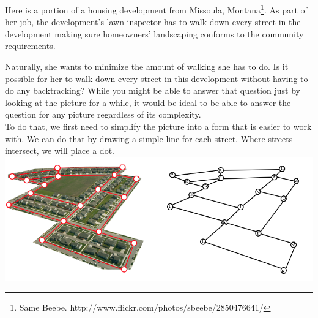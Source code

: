 \begin{example}{}{}
Here is a portion of a housing development from Missoula, Montana\footnote{Same Beebe. http://www.flickr.com/photos/sbeebe/2850476641/}.  As part of her job, the development's lawn inspector has to walk down every street in the development making sure homeowners' landscaping conforms to the community requirements.\\
\begin{center}
\end{center}

Naturally, she wants to minimize the amount of walking she has to do.  Is it possible for her to walk down every street in this development without having to do any backtracking?  While you might be able to answer that question just by looking at the picture for a while, it would be ideal to be able to answer the question for any picture regardless of its complexity.\\

To do that, we first need to simplify the picture into a form that is easier to work with.  We can do that by drawing a simple line for each street.  Where streets intersect, we will place a dot. \\
 
 \includegraphics{graph-theory-graphics/GraphPictureDot.png}
\end{example}

